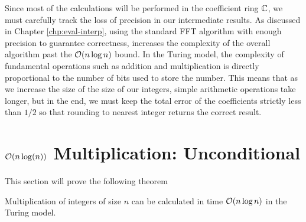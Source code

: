 Since most of the calculations will be performed in the coefficient ring ${\mathbb C}$, we must carefully track the loss of precision in our intermediate results. As discussed in Chapter \ref{chp:eval-interp}, using the standard FFT algorithm with enough precision to guarantee correctness, increases the complexity of the overall algorithm past the $\mathcal O(n \log n)$ bound. In the Turing model, the complexity of fundamental operations such as addition and multiplication is directly proportional to the number of bits used to store the number. This means that as we increase the size of the size of our integers, simple arithmetic operations take longer, but in the end, we must keep the total error of the coefficients strictly less than $1/2$ so that rounding to nearest integer returns the correct result. 





\section{$\mathcal O(n\log(n))$ Multiplication: Unconditional}
\label{subsec:nlogn}

This section will prove the following theorem

\begin{theorem}\label{thm:main-theorem}
    \smallskip

    Multiplication of integers of size $n$ can be calculated in time $\mathcal O(n \log n)$ in the Turing model.
\end{theorem}

